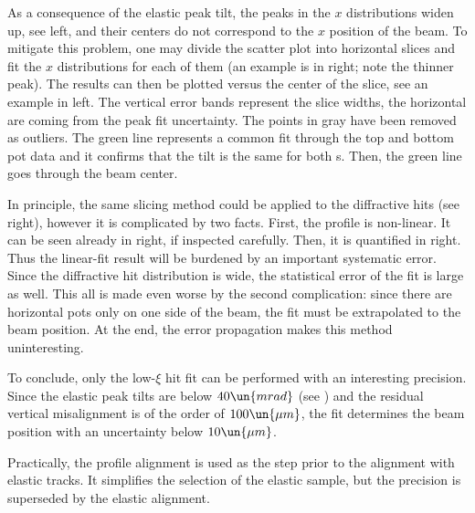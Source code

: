 As a consequence of the elastic peak tilt, the peaks in the $x$ distributions widen up, see  left, and their centers do not correspond to the $x$ position of the beam. To mitigate this problem, one may divide the scatter plot into horizontal slices and fit the $x$ distributions for each of them (an example is in  right; note the thinner peak). The results can then be plotted versus the center of the slice, see an example in  left. The vertical error bands represent the slice widths, the horizontal are coming from the peak fit uncertainty. The points in gray have been removed as outliers. The green line represents a common fit through the top and bottom pot data and it confirms that the tilt is the same for both s. Then, the green line goes through the beam center.


In principle, the same slicing method could be applied to the diffractive hits (see  right), however it is complicated by two facts. First, the profile is non-linear. It can be seen already in  right, if inspected carefully.  Then, it is quantified in  right. Thus the linear-fit result will be burdened by an important systematic error. Since the diffractive hit distribution is wide, the statistical error of the fit is large as well. This all is made even worse by the second complication: since there are horizontal pots only on one side of the beam, the fit must be extrapolated to the beam position. At the end, the error propagation makes this method uninteresting.


To conclude, only the low-$\xi$ hit fit can be performed with an interesting precision. Since the elastic peak tilts are below $40\un{mrad}$ (see ) and the residual vertical misalignment is of the order of $100\un{\mu m}$, the fit determines the beam position with an uncertainty below $10\un{\mu m}$.


Practically, the profile alignment is used as the step prior to the alignment with elastic tracks. It simplifies the selection of the elastic sample, but the precision is superseded by the elastic alignment.

